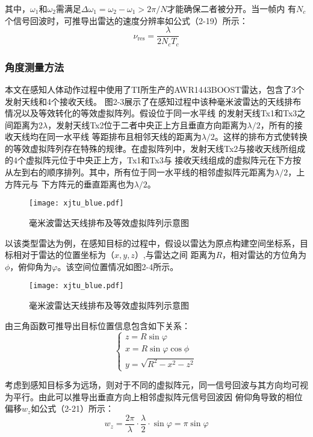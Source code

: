其中，$\omega_{1}$和$\omega_{2}$需满足$\Delta\omega_{1}=\omega_{2}-\omega_{1}>2\pi/N$才能确保二者被分开。当一帧内
有$N_{c}$个信号回波时，可推导出雷达的速度分辨率如公式（2-19）所示：
\begin{equation}
    \nu_{\mathrm{res}}=\frac{\lambda}{2N_{c}T_{c}}
\end{equation}

\subsubsection{角度测量方法}
本文在感知人体动作过程中使用了TI所生产的AWR1443BOOST雷达，包含了3个发射天线和4个接收天线。
图2-3展示了在感知过程中该种毫米波雷达的天线排布情况以及等效转化的等效虚拟阵列。假设位于同一水平线
的发射天线Tx1和Tx3之间距离为2$\lambda$，发射天线Tx2位于二者中央正上方且垂直方向距离为$\lambda/2$，所有的接收天线均在同一水平线
等距排布且相邻天线的距离为$\lambda/2$。这样的排布方式使转换的等效虚拟阵列存在特殊的规律。在虚拟阵列中，发射天线Tx2与接收天线所组成的4个虚拟阵元位于中央正上方，Tx1和Tx3与
接收天线组成的虚拟阵元在下方按从左到右的顺序排列。其中，所有位于同一水平线的相邻虚拟阵元距离为$\lambda/2$，上方阵元与
下方阵元的垂直距离也为$\lambda/2$。
\begin{figure}[H]
    \centering
    \texttt{[image: xjtu\_blue.pdf]}
    \caption{毫米波雷达天线排布及等效虚拟阵列示意图}
\end{figure}

以该类型雷达为例，在感知目标的过程中，假设以雷达为原点构建空间坐标系，目标相对于雷达的位置坐标为（$x,y,z$）,与雷达之间
距离为$R$，相对雷达的方位角为$\phi$，俯仰角为$\varphi$。该空间位置情况如图2-4所示。
\begin{figure}[H]
    \centering
    \texttt{[image: xjtu\_blue.pdf]}
    \caption{毫米波雷达天线排布及等效虚拟阵列示意图}
\end{figure}

由三角函数可推导出目标位置信息包含如下关系：
\begin{equation}
    \begin{cases}z=R\sin\varphi\\x=R\sin\varphi\cos\phi\\y=\sqrt{R^2-x^2-z^2}\end{cases}
\end{equation}

考虑到感知目标多为远场，则对于不同的虚拟阵元，同一信号回波与其方向均可视为平行。由此可以推导出垂直方向上相邻虚拟阵元信号回波因
俯仰角导致的相位偏移$w_{z}$如公式（2-21）所示：
\begin{equation}
    w_{z}=\frac{2\pi}{\lambda}\cdot\frac{\lambda}{2}\cdot\sin\varphi=\pi\sin\varphi 
\end{equation}

